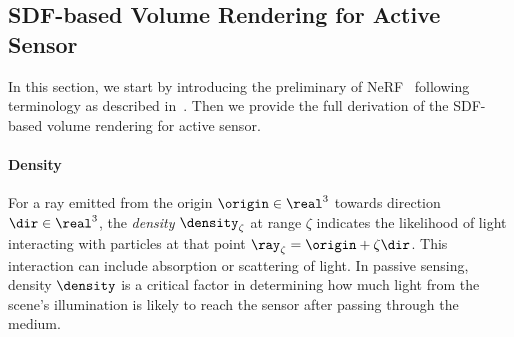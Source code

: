 \clearpage
\subsection{SDF-based Volume Rendering for Active Sensor}\label{sec:sup_sdf_vol_render}
In this section, we start by introducing the preliminary of NeRF~\cite{mildenhall2020nerf} following terminology as described in~\cite{tagliasacchi2022volume}. Then we provide the full derivation of the SDF-based volume rendering for active sensor. 

\paragraph{Density}
For a ray emitted from the origin $\origin \in \real^3$ towards direction $\dir \in \real^3$, the \textit{density} $\density_\zeta$ at range $\zeta$ indicates the likelihood of light interacting with particles at that point $\ray_\zeta = \origin + \zeta \dir$. This interaction can include absorption or scattering of light. In passive sensing, density $\density$ is a critical factor in determining how much light from the scene's illumination is likely to reach the sensor after passing through the medium.

